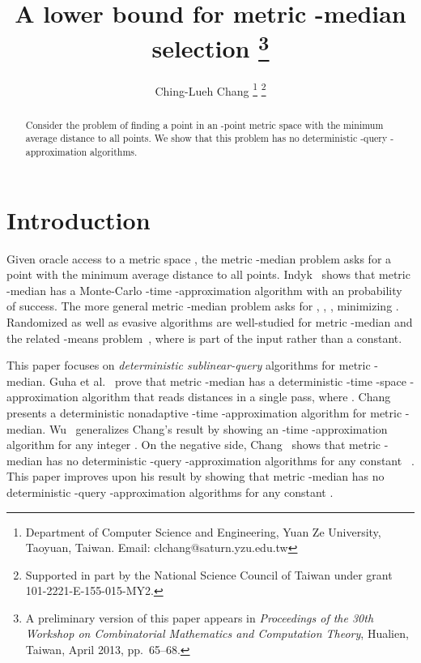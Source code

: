 \documentclass[letterpaper,12pt]{article}
\begin{document}
\title{A lower bound for metric -median selection \footnote{A
preliminary version of this paper appears in {\em Proceedings of the 30th
Workshop on Combinatorial Mathematics and Computation Theory}, Hualien,
Taiwan, April 2013, pp.~65--68.}}

\author{
Ching-Lueh Chang \footnote{Department of Computer Science and
Engineering, Yuan Ze University, Taoyuan, Taiwan. Email:
clchang@saturn.yzu.edu.tw}
\footnote{Supported in part by the National Science Council
of Taiwan under
grant
101-2221-E-155-015-MY2.}
}


\maketitle

\begin{abstract}
Consider the problem of finding
a point in
an -point
metric space
with the minimum average distance to
all
points.
We show
that
this problem
has no deterministic
-query -approximation algorithms.
\end{abstract}

\section{Introduction}

Given oracle access to
a
metric
space ,
the {\sc metric -median}
problem asks for a point with the minimum average distance to all points.
Indyk~\cite{Ind99, Ind00} shows that {\sc metric -median} has a
Monte-Carlo -time -approximation algorithm
with an  probability of success.
The more general {\sc metric -median} problem asks for
,
, ,  minimizing
.
Randomized
as well as
evasive
algorithms are well-studied for
{\sc metric -median} and the related -means problem~\cite{GMMMO03,
MP04, AGKMMP04, Che09, KSS10, JKS12},
where  is part of the input rather than a constant.


This paper focuses on {\em deterministic sublinear-query} algorithms for
{\sc metric -median}.
Guha et al.~\cite[Sec.~3.1--3.2]{GMMMO03} prove
that {\sc metric -median} has
a deterministic
-time
-space
-approximation algorithm
that reads distances in a single pass, where .
Chang~\cite{Cha13} presents a deterministic
nonadaptive
-time -approximation algorithm for {\sc metric -median}.
Wu~\cite{Wu14} generalizes Chang's result by showing an
-time
-approximation
algorithm for
any integer .
On the negative side,
Chang~\cite{Cha12}
shows that {\sc metric -median}
has no
deterministic
-query
-approximation algorithms for any constant
~\cite{Cha12}.
This
paper
improves upon his result by showing
that {\sc metric -median} has no deterministic
-query -approximation algorithms for any
constant .
\end{document}
